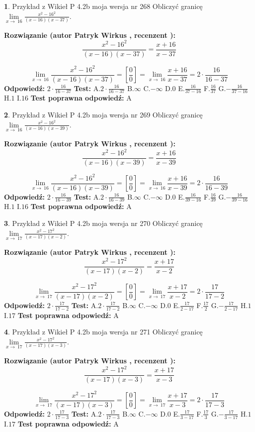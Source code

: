 \documentclass[12pt, a4paper]{article}
\theoremstyle{definition} %
\newtheorem{zad}{}
\newcommand{\zadStart}[1]{\begin{zad}#1\newline}
\newcommand{\zadStop}{\end{zad}}
\newcommand{\rozwStart}[2]{\noindent \textbf{Rozwiązanie (autor #1 , recenzent #2): }\newline}
\newcommand{\rozwStop}{\newline}
\newcommand{\odpStart}{\noindent \textbf{Odpowiedź:}\newline}
\newcommand{\odpStop}{\newline}
\newcommand{\testStart}{\noindent \textbf{Test:}\newline}
\newcommand{\testStop}{\newline}
\newcommand{\kluczStart}{\noindent \textbf{Test poprawna odpowiedź:}\newline}
\newcommand{\kluczStop}{\newline}
\begin{document}
\zadStart{Przykład z Wikieł P 4.2b moja wersja nr 268}
Obliczyć granicę $\lim\limits_{x\to\ 16}\frac{x^{2}-16^{2}}{(x-16)(x-37)}$.
\zadStop
\rozwStart{Patryk Wirkus}{}
$$\frac{x^{2}-16^{2}}{(x-16)(x-37)}=\frac{x+16}{x-37}$$

$$\lim\limits_{x\to\ 16}\frac{x^{2}-16^{2}}{(x-16)(x-37)}=[\frac{0}{0}]=\lim\limits_{x\to\ 16}\frac{x+16}{x-37}=2 \cdot \frac{16}{16-37}$$
\rozwStop
\odpStart
$2 \cdot \frac{16}{16-37}$
\odpStop
\testStart
A.$2 \cdot \frac{16}{16-37}$
B.$\infty$
C.$-\infty$
D.$0$
E.$\frac{16}{37-16}$
F.$\frac{16}{37}$
G.$-\frac{16}{37-16}$
H.$1$
I.$16$
\testStop
\kluczStart
A
\kluczStop



\zadStart{Przykład z Wikieł P 4.2b moja wersja nr 269}
Obliczyć granicę $\lim\limits_{x\to\ 16}\frac{x^{2}-16^{2}}{(x-16)(x-39)}$.
\zadStop
\rozwStart{Patryk Wirkus}{}
$$\frac{x^{2}-16^{2}}{(x-16)(x-39)}=\frac{x+16}{x-39}$$

$$\lim\limits_{x\to\ 16}\frac{x^{2}-16^{2}}{(x-16)(x-39)}=[\frac{0}{0}]=\lim\limits_{x\to\ 16}\frac{x+16}{x-39}=2 \cdot \frac{16}{16-39}$$
\rozwStop
\odpStart
$2 \cdot \frac{16}{16-39}$
\odpStop
\testStart
A.$2 \cdot \frac{16}{16-39}$
B.$\infty$
C.$-\infty$
D.$0$
E.$\frac{16}{39-16}$
F.$\frac{16}{39}$
G.$-\frac{16}{39-16}$
H.$1$
I.$16$
\testStop
\kluczStart
A
\kluczStop



\zadStart{Przykład z Wikieł P 4.2b moja wersja nr 270}
Obliczyć granicę $\lim\limits_{x\to\ 17}\frac{x^{2}-17^{2}}{(x-17)(x-2)}$.
\zadStop
\rozwStart{Patryk Wirkus}{}
$$\frac{x^{2}-17^{2}}{(x-17)(x-2)}=\frac{x+17}{x-2}$$

$$\lim\limits_{x\to\ 17}\frac{x^{2}-17^{2}}{(x-17)(x-2)}=[\frac{0}{0}]=\lim\limits_{x\to\ 17}\frac{x+17}{x-2}=2 \cdot \frac{17}{17-2}$$
\rozwStop
\odpStart
$2 \cdot \frac{17}{17-2}$
\odpStop
\testStart
A.$2 \cdot \frac{17}{17-2}$
B.$\infty$
C.$-\infty$
D.$0$
E.$\frac{17}{2-17}$
F.$\frac{17}{2}$
G.$-\frac{17}{2-17}$
H.$1$
I.$17$
\testStop
\kluczStart
A
\kluczStop



\zadStart{Przykład z Wikieł P 4.2b moja wersja nr 271}
Obliczyć granicę $\lim\limits_{x\to\ 17}\frac{x^{2}-17^{2}}{(x-17)(x-3)}$.
\zadStop
\rozwStart{Patryk Wirkus}{}
$$\frac{x^{2}-17^{2}}{(x-17)(x-3)}=\frac{x+17}{x-3}$$

$$\lim\limits_{x\to\ 17}\frac{x^{2}-17^{2}}{(x-17)(x-3)}=[\frac{0}{0}]=\lim\limits_{x\to\ 17}\frac{x+17}{x-3}=2 \cdot \frac{17}{17-3}$$
\rozwStop
\odpStart
$2 \cdot \frac{17}{17-3}$
\odpStop
\testStart
A.$2 \cdot \frac{17}{17-3}$
B.$\infty$
C.$-\infty$
D.$0$
E.$\frac{17}{3-17}$
F.$\frac{17}{3}$
G.$-\frac{17}{3-17}$
H.$1$
I.$17$
\testStop
\kluczStart
A
\kluczStop
\end{document}
